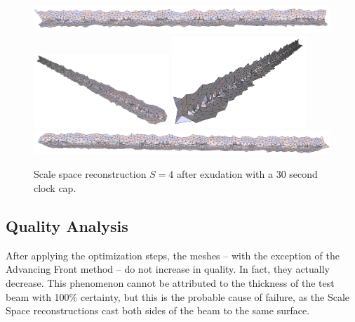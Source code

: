 \documentclass[12pt]{drexelthesis}
\let\Oldsubsection\subsection
\renewcommand{\subsection}{\FloatBarrier\Oldsubsection}
\begin{document}
\begin{figure}[!ht]
	\centering
		\includegraphics[width=5in]{simulated-lab-scan/0noise/optimizedNeat/scalespace4everything00.png}
		\includegraphics[width=2in]{simulated-lab-scan/0noise/optimizedNeat/scalespace4everything01.png}
		\includegraphics[width=2in]{simulated-lab-scan/0noise/optimizedNeat/scalespace4everything02.png}
		\includegraphics[width=5in]{simulated-lab-scan/0noise/optimizedNeat/scalespace4everything03.png}
		\caption[Scale space reconstruction $S = 4$ after exudation with a 30 second clock cap]{\centering Scale space reconstruction $S = 4$ after exudation with a 30 second clock cap.}
	\label{zeronoise:scalespace4everything}
\end{figure}

\subsection{Quality Analysis}

After applying the optimization steps, the meshes -- with the exception of the Advancing Front method -- do not increase in quality. In fact, they actually decrease. This phenomenon cannot be attributed to the thickness of the test beam with 100\% certainty, but this is the probable cause of failure, as the Scale Space reconstructions cast both sides of the beam to the same surface.
\end{document}
